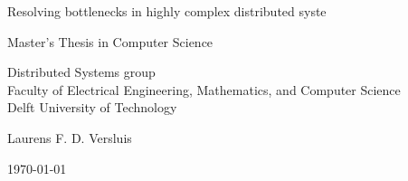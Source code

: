 \begin{titlepage}

  \begin{center}
  \null\vfill
    \begin{center}
    \LARGE{Resolving bottlenecks in highly complex distributed syste}
    \end{center}

    \vspace{3cm}

    \begin{large}
    Master's Thesis in Computer Science
    \end{large}

    \vspace{1.5cm}

    \begin{normalsize}
	Distributed Systems group\\
    Faculty of Electrical Engineering, Mathematics, and Computer Science\\
    Delft University of Technology
    \end{normalsize}

    \vspace{2.0cm}

    \begin{normalsize}
    Laurens F. D. Versluis
    \end{normalsize}

    \vspace{1.0cm}

    \today

  \vfill
  \end{center}

\end{titlepage}


